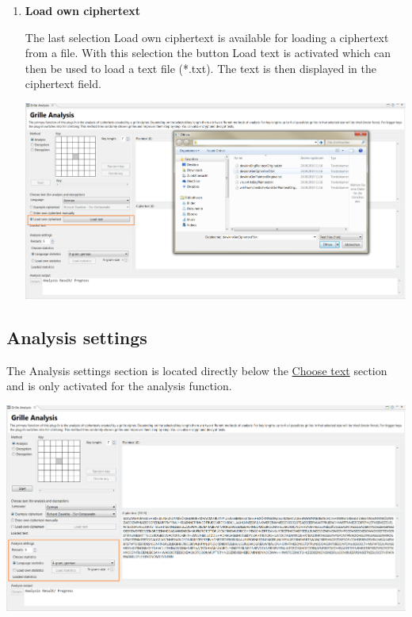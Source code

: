 \documentclass[fontsize=12pt, DIV=15, parskip=half-]{scrartcl}
\theoremstyle{break}
\begin{document}
\begin{enumerate}[label=(\alph*), leftmargin=*]
\item \textbf{Load own ciphertext}

The last selection \glqq Load own ciphertext \grqq{} is available for loading a ciphertext from a file. With this selection the button \glqq Load text \grqq{} is activated which can then be used to load a text file (*.txt). The text is then displayed in the ciphertext field.

\includegraphics[scale=0.4]{enFleissnerCipherLoadOwn.png}
\end{enumerate} 


\subsection{Analysis settings}
The \glqq Analysis settings\grqq{} section is located directly below the \glqq \hyperlink{txtausw}{Choose text}\grqq{} section and is only activated for the analysis function.

\includegraphics[scale=0.45]{enFleissnerAnalysisSettings.png}
\end{document}
